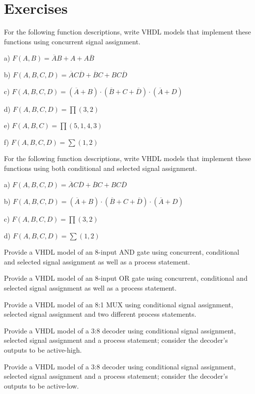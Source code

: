 \section{Exercises}
\begin{my_num_list}
\item For the following function descriptions, write VHDL models that implement these functions using concurrent signal assignment.

a) $F(A,B) =\overline{A}B +A +A\overline{B}$

b) $F(A,B,C,D) =\overline{A}C\overline{D} +\overline{B}C +BC\overline{D}$

c) $F(A,B,C,D) =(\overline{A}+B)\cdot(\overline{B}+C+\overline{D})\cdot(\overline{A}+D)$

d) $F(A,B,C,D) = \displaystyle\prod(3,2) $

e) $F(A,B,C) = \displaystyle\prod(5,1,4,3) $

f) $F(A,B,C,D) = \displaystyle\sum(1,2) $

\item For the following function descriptions, write VHDL models that implement these functions using both conditional and selected signal assignment.

a) $F(A,B,C,D) =\overline{A}C\overline{D} +\overline{B}C +BC\overline{D}$

b) $F(A,B,C,D) =(\overline{A}+B)\cdot(\overline{B}+C+\overline{D})\cdot(\overline{A}+D)$

c) $F(A,B,C,D) = \displaystyle\prod(3,2) $

d) $F(A,B,C,D) = \displaystyle\sum(1,2) $

\item Provide a VHDL model of an 8-input AND gate using concurrent, conditional and selected signal assignment as well as a process statement.
\item Provide a VHDL model of an 8-input OR gate using concurrent, conditional and selected signal assignment as well as a process statement.
\item Provide a VHDL model of an 8:1 MUX using conditional signal assignment, selected signal assignment and two different process statements.
\item Provide a VHDL model of a 3:8 decoder using conditional signal assignment, selected signal assignment and a process statement; consider the decoder’s outputs to be active-high.
\item Provide a VHDL model of a 3:8 decoder using conditional signal assignment, selected signal assignment and a process statement; consider the decoder’s outputs to be active-low.
\end{my_num_list}
